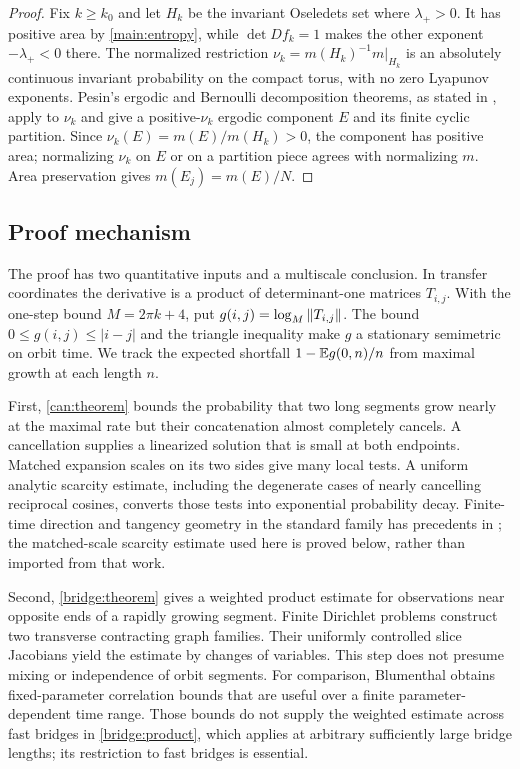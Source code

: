 \begin{proof}
Fix $k\ge k_0$ and let $H_k$ be the invariant Oseledets set where
$\lambda_+>0$. It has positive area by \cref{main:entropy}, while
$\det Df_k=1$ makes the other exponent $-\lambda_+<0$ there.
The normalized restriction $\nu_k=m(H_k)^{-1}m|_{H_k}$ is an absolutely
continuous invariant probability on the compact torus, with no zero
Lyapunov exponents. Pesin's ergodic and Bernoulli decomposition theorems,
as stated in \cite[Theorems~3.3--3.4]{KatokBurns1994}, apply to $\nu_k$
and give a positive-$\nu_k$ ergodic component $E$ and its finite cyclic
partition. Since $\nu_k(E)=m(E)/m(H_k)>0$, the component has positive
area; normalizing $\nu_k$ on $E$ or on a partition piece agrees with
normalizing $m$. Area preservation gives $m(E_j)=m(E)/N$.
\end{proof}

\subsection*{Proof mechanism}

The proof has two quantitative inputs and a multiscale conclusion.
In transfer coordinates the derivative is a product of determinant-one
matrices $T_{i,j}$. With the one-step bound $M=2\pi k+4$, put
$g(i,j)=\log_M\left\lVert T_{i,j}\right\rVert$. The bound $0\le g(i,j)\le|i-j|$
and the triangle inequality make $g$ a stationary semimetric on orbit
time. We track the expected shortfall $1-\mathbb{E} g(0,n)/n$ from maximal
growth at each length $n$.

First, \cref{can:theorem} bounds the probability that two long segments
grow nearly at the maximal rate but their concatenation almost
completely cancels. A cancellation supplies a linearized solution that
is small at both endpoints. Matched expansion scales on its two sides
give many local tests. A uniform analytic scarcity estimate, including
the degenerate cases of nearly cancelling reciprocal cosines, converts
those tests into exponential probability decay. Finite-time direction
and tangency geometry in the standard family has precedents in
\cite{BloorLuzzatto2009}; the matched-scale scarcity estimate used
here is proved below, rather than imported from that work.

Second, \cref{bridge:theorem} gives a weighted product estimate for
observations near opposite ends of a rapidly growing segment. Finite
Dirichlet problems construct two transverse contracting graph families.
Their uniformly controlled slice Jacobians yield the estimate by
changes of variables. This step does not presume mixing or independence
of orbit segments. For comparison, Blumenthal
\cite{Blumenthal2021} obtains fixed-parameter correlation
bounds that are useful over a finite parameter-dependent time range.
Those bounds do not supply the weighted estimate across fast bridges in
\cref{bridge:product}, which applies at arbitrary sufficiently large
bridge lengths; its restriction to fast bridges is essential.

